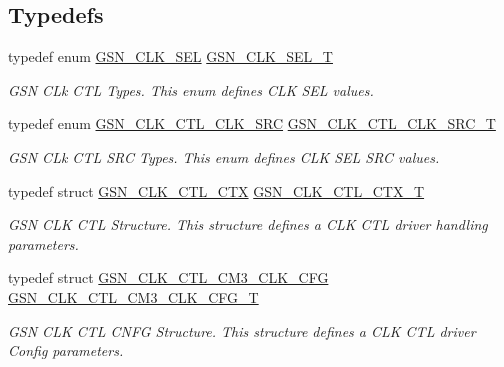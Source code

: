 \subsection*{Typedefs}
\begin{DoxyCompactItemize}
\item 
typedef enum \hyperlink{a00644_ga1b0f0bc3777cd50abe5f39797df023b5}{GSN\_\-CLK\_\-SEL} \hyperlink{a00644_gaf4925c33b2dac850008f7d4463760580}{GSN\_\-CLK\_\-SEL\_\-T}
\begin{DoxyCompactList}\small\item\em GSN CLk CTL Types. This enum defines CLK SEL values. \end{DoxyCompactList}\item 
typedef enum \hyperlink{a00644_ga53f0e57a2fa30eef772141f9ac772202}{GSN\_\-CLK\_\-CTL\_\-CLK\_\-SRC} \hyperlink{a00644_ga95d23078ba56d33653b82794ca56f5d6}{GSN\_\-CLK\_\-CTL\_\-CLK\_\-SRC\_\-T}
\begin{DoxyCompactList}\small\item\em GSN CLk CTL SRC Types. This enum defines CLK SEL SRC values. \end{DoxyCompactList}\item 
typedef struct \hyperlink{a00039}{GSN\_\-CLK\_\-CTL\_\-CTX} \hyperlink{a00644_ga9e7d0d37ecaac3d985e5618e1c8c57d5}{GSN\_\-CLK\_\-CTL\_\-CTX\_\-T}
\begin{DoxyCompactList}\small\item\em GSN CLK CTL Structure. This structure defines a CLK CTL driver handling parameters. \end{DoxyCompactList}\item 
typedef struct \hyperlink{a00038}{GSN\_\-CLK\_\-CTL\_\-CM3\_\-CLK\_\-CFG} \hyperlink{a00644_ga8a7770f0cdba320f9d6418cc8419b450}{GSN\_\-CLK\_\-CTL\_\-CM3\_\-CLK\_\-CFG\_\-T}
\begin{DoxyCompactList}\small\item\em GSN CLK CTL CNFG Structure. This structure defines a CLK CTL driver Config parameters. \end{DoxyCompactList}\end{DoxyCompactItemize}
